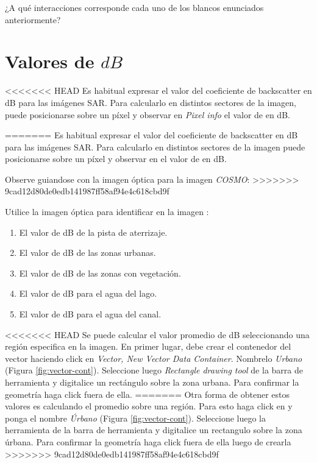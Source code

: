 \begin{que}
    ¿A qué interacciones corresponde cada uno de los blancos enunciados anteriormente?
\end{que}

\section{Valores de $dB$}

<<<<<<< HEAD
Es habitual expresar el valor del coeficiente de backscatter en dB para las imágenes SAR. Para calcularlo en distintos sectores de la imagen, puede posicionarse sobre un píxel y observar en \emph{Pixel info} el valor de  en dB.

=======
Es habitual expresar el valor del coeficiente de backscatter en dB para las imágenes SAR. Para calcularlo en distintos sectores de la imagen puede posicionarse sobre un píxel y observar en  el valor de  en dB.

Observe guiandose con la imagen óptica para la imagen \emph{COSMO}:
>>>>>>> 9cad12d80de0edb141987ff58af94e4c618cbd9f

Utilice la imagen óptica para identificar en la imagen :

 \begin{enumerate}
     \item El valor de dB de la pista de aterrizaje.
     \item El valor de dB de las zonas urbanas.
     \item El valor de dB de las zonas con vegetación.
     \item El valor de dB para el agua del lago.
     \item El valor de dB para el agua del canal.
 \end{enumerate}

<<<<<<< HEAD
Se puede calcular el valor promedio de dB seleccionando una región especifica en la imagen. En primer lugar, debe crear el contenedor del vector haciendo click en \emph{Vector, New Vector Data Container}. Nombrelo \emph{Urbano} (Figura \ref{fig:vector-cont}). Seleccione luego  \emph{Rectangle drawing tool} de la barra de herramienta y digitalice un rectángulo sobre la zona urbana. Para confirmar la geometría haga click fuera de ella.
=======
Otra forma de obtener estos valores es calculando el promedio sobre una región. Para esto haga click en  y ponga el nombre \emph{Úrbano} (Figura \ref{fig:vector-cont}). Seleccione luego la herramienta  de la barra de herramienta y digitalice un rectangulo sobre la zona úrbana. Para confirmar la geometría haga click fuera de ella luego de crearla
>>>>>>> 9cad12d80de0edb141987ff58af94e4c618cbd9f

